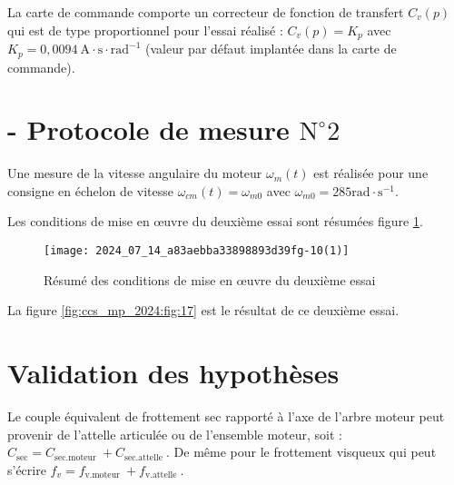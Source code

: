 
La carte de commande comporte un correcteur de fonction de transfert $C_{v}(p)$ qui est de type proportionnel pour l'essai réalisé : $C_{v}(p)=K_{p}$ avec $K_{p}=0,0094 \mathrm{~A} \cdot \mathrm{s} \cdot \mathrm{rad}^{-1}$ (valeur par défaut implantée dans la carte de commande).

\section*{- Protocole de mesure $\mathrm{N}^{\circ} 2$}
Une mesure de la vitesse angulaire du moteur $\omega_{m}(t)$ est réalisée pour une consigne en échelon de vitesse $\omega_{c m}(t)=\omega_{m 0}$ avec $\omega_{m 0}=285 \mathrm{rad} \cdot \mathrm{s}^{-1}$.

Les conditions de mise en œuvre du deuxième essai sont résumées figure \ref{fig:ccs_mp_2024:fig:16}.

\begin{figure}[!h]\centering
\texttt{[image: 2024\_07\_14\_a83aebba33898893d39fg-10(1)]}
\caption{\label{fig:ccs_mp_2024:fig:16}Résumé des conditions de mise en œuvre du deuxième essai}
\end{figure}
La figure \ref{fig:ccs_mp_2024:fig:17} est le résultat de ce deuxième essai.




\section*{Validation des hypothèses}
Le couple équivalent de frottement sec rapporté à l'axe de l'arbre moteur peut provenir de l'attelle articulée ou de l'ensemble moteur, soit : $C_{\mathrm{sec}}=C_{\text {sec.moteur }}+C_{\text {sec.attelle }}$. De même pour le frottement visqueux qui peut s'écrire $f_{v}=f_{\text {v.moteur }}+f_{\text {v.attelle }}$.

